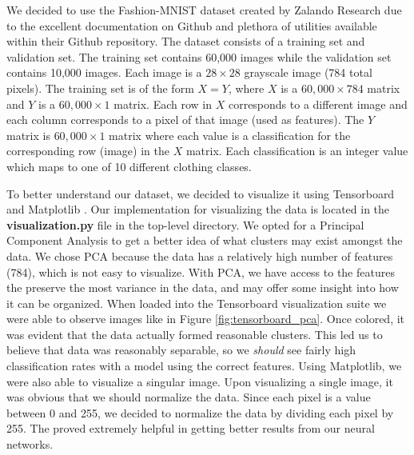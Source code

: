 \documentclass[titlepage]{article}
\begin{document}
\par We decided to use the Fashion-MNIST dataset created by Zalando Research due to the excellent documentation on Github and plethora of utilities available within their Github repository. The dataset consists of a training set and validation set. The training set contains 60,000 images while the validation set contains 10,000 images. Each image is a $28 \times 28$ grayscale image (784 total pixels). The training set is of the form $X = Y$, where $X$ is a $60,000 \times 784$ matrix and $Y$ is a $60,000 \times 1$ matrix. Each row in $X$ corresponds to a different image and each column corresponds to a pixel of that image (used as features). The $Y$ matrix is $60,000 \times 1$ matrix where each value is a classification for the corresponding row (image) in the $X$ matrix. Each classification is an integer value which maps to one of 10 different clothing classes.

\par To better understand our dataset, we decided to visualize it using Tensorboard \cite{tensorboard} and Matplotlib \cite{matplotlib}. Our implementation for visualizing the data is located in the \textbf{visualization.py} file in the top-level directory. We opted for a Principal Component Analysis to get a better idea of what clusters may exist amongst the data. We chose PCA because the data has a relatively high number of features (784), which is not easy to visualize. With PCA, we have access to the features the preserve the most variance in the data, and may offer some insight into how it can be organized. When loaded into the Tensorboard visualization suite we were able to observe images like in Figure \ref{fig:tensorboard_pca}. Once colored, it was evident that the data actually formed reasonable clusters. This led us to believe that data was reasonably separable, so we \textit{should} see fairly high classification rates with a model using the correct features. Using Matplotlib, we were also able to visualize a singular image. Upon visualizing a single image, it was obvious that we should normalize the data. Since each pixel is a value between 0 and 255, we decided to normalize the data by dividing each pixel by 255. The proved extremely helpful in getting better results from our neural networks.
\end{document}
